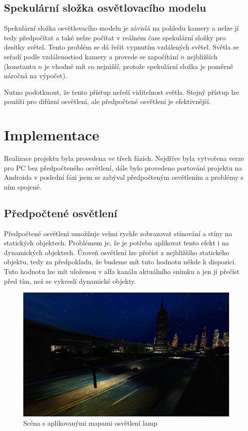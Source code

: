 \documentclass[11pt,twoside,a4paper]{book}
\begin{document}
\section{Spekulární složka osvětlovacího modelu}
Spekulární složka osvětlovacího modelu je závislá na pohledu kamery a nelze jí tedy předpočítat a také nelze počítat v reálném čase spekulární složky pro desítky světel. Tento problém se dá řešit vypnutím vzdálených světel. Světla se seřadí podle vzdálenosti\linebreak od kamery a provede se započítání $n$ nejbližších (konstantu $n$ je vhodné mít co nejnižší, protože spekulární složka je poměrně náročná na výpočet). 

Nutno podotknout, že tento přístup neřeší viditelnost světla. Stejný přístup lze použít\linebreak i pro difúzní osvětlení, ale předpočtené osvětlení je efektivnější.

\chapter{Implementace}
Realizace projektu byla provedena ve třech fázích. Nejdříve byla vytvořena verze pro PC bez předpočteného osvětlení, dále bylo provedeno portování projektu na Android\linebreak a v poslední fázi jsem se zabýval předpočteným osvětlením a problémy s ním spojené.

\section{Předpočtené osvětlení}
Předpočtené osvětlení umožňuje velmi rychle zobrazovat stínování a stíny na statických objektech. Problémem je, že je potřeba aplikovat tento efekt i na dynamických objektech. Úroveň osvětlení lze přečíst z nejbližšího statického objektu, tedy za předpokladu, že budeme mít tuto hodnotu někde k dispozici. Tuto hodnotu lze mít uloženou v alfa kanálu aktuálního snímku a jen jí přečíst před tím, než se vykreslí dynamické objekty.

\begin{figure}[h!]
\begin{center}
\includegraphics[width=120mm]{figures/lamps.png}
\caption{Scéna s aplikovanými mapami osvětlení lamp}
\end{center}
\end{figure}
\end{document}
